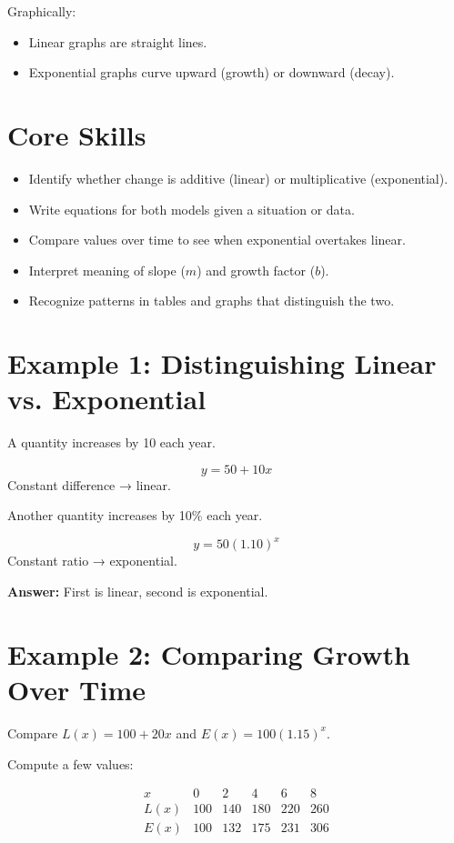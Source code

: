 \documentclass[14pt]{extarticle}
\begin{document}
Graphically:
\begin{itemize}
  \item Linear graphs are straight lines.
  \item Exponential graphs curve upward (growth) or downward (decay).
\end{itemize}

\section*{Core Skills}
\begin{itemize}
  \item Identify whether change is additive (linear) or multiplicative (exponential).
  \item Write equations for both models given a situation or data.
  \item Compare values over time to see when exponential overtakes linear.
  \item Interpret meaning of slope (\(m\)) and growth factor (\(b\)).
  \item Recognize patterns in tables and graphs that distinguish the two.
\end{itemize}

\section*{Example 1: Distinguishing Linear vs. Exponential}

A quantity increases by 10 each year.

\[
y = 50 + 10x
\]
Constant difference → linear.

Another quantity increases by 10\% each year.

\[
y = 50(1.10)^x
\]
Constant ratio → exponential.

\textbf{Answer:} First is linear, second is exponential.

\section*{Example 2: Comparing Growth Over Time}

Compare \(L(x) = 100 + 20x\) and \(E(x) = 100(1.15)^x.\)

Compute a few values:

\[
\begin{array}{c|ccccc}
x & 0 & 2 & 4 & 6 & 8 \\ \hline
L(x) & 100 & 140 & 180 & 220 & 260 \\
E(x) & 100 & 132 & 175 & 231 & 306
\end{array}
\]
\end{document}
